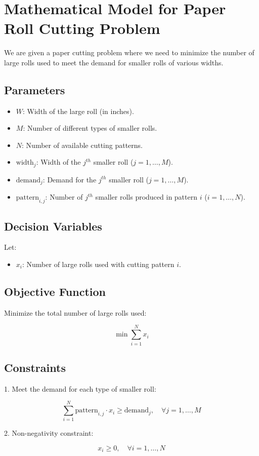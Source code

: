 \documentclass{article}
\begin{document}
\section*{Mathematical Model for Paper Roll Cutting Problem}

We are given a paper cutting problem where we need to minimize the number of large rolls used to meet the demand for smaller rolls of various widths.

\subsection*{Parameters}

\begin{itemize}
    \item $W$: Width of the large roll (in inches).
    \item $M$: Number of different types of smaller rolls.
    \item $N$: Number of available cutting patterns.
    \item $\text{width}_j$: Width of the $j^{th}$ smaller roll ($j = 1, \ldots, M$).
    \item $\text{demand}_j$: Demand for the $j^{th}$ smaller roll ($j = 1, \ldots, M$).
    \item $\text{pattern}_{i,j}$: Number of $j^{th}$ smaller rolls produced in pattern $i$ ($i = 1, \ldots, N$).
\end{itemize}

\subsection*{Decision Variables}

Let:
\begin{itemize}
    \item $x_i$: Number of large rolls used with cutting pattern $i$.
\end{itemize}

\subsection*{Objective Function}

Minimize the total number of large rolls used:

\[
\min \sum_{i=1}^{N} x_i
\]

\subsection*{Constraints}

1. Meet the demand for each type of smaller roll:

\[
\sum_{i=1}^{N} \text{pattern}_{i,j} \cdot x_i \geq \text{demand}_j, \quad \forall j = 1, \ldots, M
\]

2. Non-negativity constraint:

\[
x_i \geq 0, \quad \forall i = 1, \ldots, N
\]
\end{document}
